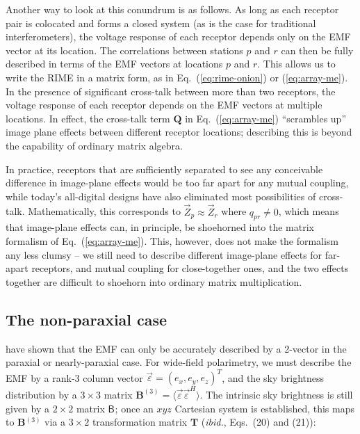 \documentclass[]{aa}
\newcommand{\herm}{H}
\newcommand{\jones}[2]{\vec {#1}_{#2}}
\newcommand{\coh}[2]{\mathsf{{#1}}_{{#2}}}
\begin{document}
Another way to look at this conundrum is as follows. As long as each
receptor pair is colocated and forms a closed system (as is the case
for traditional interferometers), the voltage response of each receptor
depends only on the EMF vector at its location. The correlations between
stations $p$ and $r$ can then be fully described in terms of the
EMF vectors at locations $p$ and $r$. This allows us to write the RIME
in a matrix form, as in Eq.~(\ref{eq:rime-onion}) or (\ref{eq:array-me}). In the presence of significant
cross-talk between more than two receptors, the voltage response of
each receptor depends on the EMF vectors at multiple locations. In effect,
the cross-talk term $\mathbf{Q}$ in Eq.~(\ref{eq:array-me}) ``scrambles up'' image plane effects between
different receptor locations; describing this is beyond the capability of ordinary matrix algebra.

In practice, receptors that are sufficiently separated to see any conceivable difference in image-plane effects would be too 
far apart for any mutual coupling, while today's all-digital designs have also eliminated most possibilities of 
cross-talk. Mathematically, this corresponds to $\jones{Z}{p} \approx \jones{Z}{r}$ where $q_{pr} \ne 0$, which means that image-plane 
effects can, in principle, be shoehorned into the matrix formalism of Eq.~(\ref{eq:array-me}). This, however, 
does not make the formalism any less clumsy -- we still need to describe different image-plane effects for far-apart receptors, and mutual coupling for close-together ones, and the two effects together are difficult to shoehorn into ordinary matrix multiplication. 

\subsection{The non-paraxial case}
\label{sec:matrix-3d}

\citet{Carozzi:ME3D} have shown that the EMF can only be accurately described by a 2-vector in the paraxial or nearly-paraxial case. For wide-field polarimetry, we must describe the EMF by a rank-3 column vector $\vec\varepsilon=(e_x,e_y,e_z)^T$, and the sky brightness distribution by a $3\times3$ matrix $\mathbf{B}^{(3)}=\langle \vec\varepsilon \vec\varepsilon^\herm \rangle.$ The intrinsic sky brightness is still given by a $2\times2$ matrix $\coh{B}{}$; once an $xyz$ Cartesian system is established, this maps to $\mathbf{B}{}^{(3)}$ via a $3\times2$ transformation matrix $\mathbf{T}$ ({\em ibid.}, Eqs.~(20) and (21)):
\end{document}
